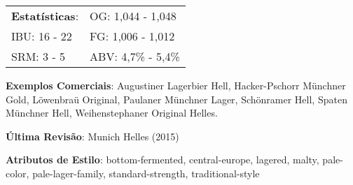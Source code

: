 \begin{tabular}{@{}p{35mm}p{35mm}@{}}
  \textbf{Estatísticas}: & OG: 1,044 - 1,048 \\
  IBU: 16 - 22  & FG: 1,006 - 1,012  \\
  SRM: 3 - 5   & ABV: 4,7\% - 5,4\%
\end{tabular}

\textbf{Exemplos Comerciais}: Augustiner Lagerbier Hell, Hacker-Pschorr Münchner Gold, Löwenbraü Original, Paulaner Münchner Lager, Schönramer Hell, Spaten Münchner Hell, Weihenstephaner Original Helles.

\textbf{Última Revisão}: Munich Helles (2015)

\textbf{Atributos de Estilo}: bottom-fermented, central-europe, lagered, malty, pale-color, pale-lager-family, standard-strength, traditional-style
